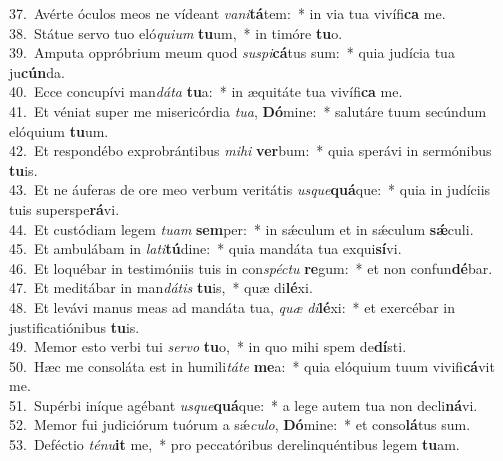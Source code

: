 {37.~}Avérte óculos meos ne vídeant \textit{va}\textit{ni}\textbf{tá}tem:~* in via tua vivífi\textbf{ca} me.\\
{38.~}Státue servo tuo eló\textit{qui}\textit{um} \textbf{tu}um,~* in timóre \textbf{tu}o.\\
{39.~}Amputa oppróbrium meum quod \textit{su}\textit{spi}\textbf{cá}tus sum:~* quia judícia tua ju\textbf{cún}da.\\
{40.~}Ecce concupívi man\textit{dá}\textit{ta} \textbf{tu}a:~* in æquitáte tua vivífi\textbf{ca} me.\\
{41.~}Et véniat super me misericórdia \textit{tu}\textit{a}, \textbf{Dó}mine:~* salutáre tuum secúndum elóquium \textbf{tu}um.\\
{42.~}Et respondébo exprobrántibus \textit{mi}\textit{hi} \textbf{ver}bum:~* quia sperávi in sermónibus \textbf{tu}is.\\
{43.~}Et ne áuferas de ore meo verbum veritátis \textit{us}\textit{que}\textbf{quá}que:~* quia in judíciis tuis superspe\textbf{rá}vi.\\
{44.~}Et custódiam legem \textit{tu}\textit{am} \textbf{sem}per:~* in sǽculum et in sǽculum \textbf{sǽ}culi.\\
{45.~}Et ambulábam in \textit{la}\textit{ti}\textbf{tú}dine:~* quia mandáta tua exqui\textbf{sí}vi.\\
{46.~}Et loquébar in testimóniis tuis in con\textit{spé}\textit{ctu} \textbf{re}gum:~* et non confun\textbf{dé}bar.\\
{47.~}Et meditábar in man\textit{dá}\textit{tis} \textbf{tu}is,~* quæ di\textbf{lé}xi.\\
{48.~}Et levávi manus meas ad mandáta tua, \textit{quæ} \textit{di}\textbf{lé}xi:~* et exercébar in justificatiónibus \textbf{tu}is.\\
{49.~}Memor esto verbi tui \textit{ser}\textit{vo} \textbf{tu}o,~* in quo mihi spem de\textbf{dí}sti.\\
{50.~}Hæc me consoláta est in humili\textit{tá}\textit{te} \textbf{me}a:~* quia elóquium tuum vivifi\textbf{cá}vit me.\\
{51.~}Supérbi iníque agébant \textit{us}\textit{que}\textbf{quá}que:~* a lege autem tua non decli\textbf{ná}vi.\\
{52.~}Memor fui judiciórum tuórum a sǽ\textit{cu}\textit{lo}, \textbf{Dó}mine:~* et conso\textbf{lá}tus sum.\\
{53.~}Deféctio \textit{té}\textit{nu}\textbf{it} me,~* pro peccatóribus derelinquéntibus legem \textbf{tu}am.\\
